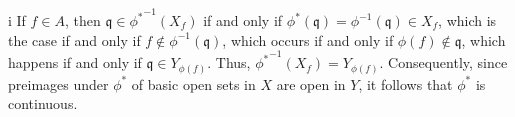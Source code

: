 \begin{partsolution}{i}
If \(f \in A\), then \(\mathfrak{q} \in {\phi^*}^{-1}(X_f)\) if and only if \(\phi^*(\mathfrak{q}) = \phi^{-1}(\mathfrak{q}) \in X_f\), which is the case if and only if \(f \notin \phi^{-1}(\mathfrak{q})\), which occurs if and only if \(\phi(f) \notin \mathfrak{q}\), which happens if and only if \(\mathfrak{q} \in Y_{\phi(f)}\).
Thus, \({\phi^*}^{-1}(X_f) = Y_{\phi(f)}\).
Consequently, since preimages under \(\phi^*\) of basic open sets in \(X\) are open in \(Y\), it follows that \(\phi^*\) is continuous.
\end{partsolution}